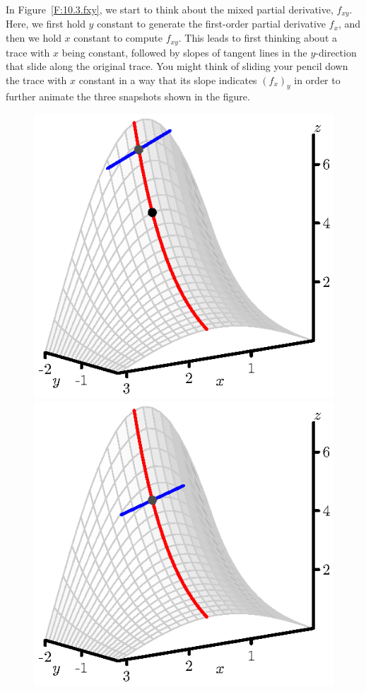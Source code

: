 \begin{activity}
	\item  In Figure~\ref{F:10.3.fxy}, we start to think about the mixed partial derivative, $f_{xy}$.  Here, we first hold $y$ constant to generate the first-order partial derivative $f_x$, and then we hold $x$ constant to compute $f_{xy}$.  This leads to first thinking about a trace with $x$ being constant, followed by slopes of tangent lines in the $y$-direction that slide along the original trace.  You might think of sliding your pencil down the trace with $x$ constant in a way that its slope indicates $(f_x)_y$ in order to further animate the three snapshots shown in the figure.
\begin{figure}[ht]
  \begin{center}
    \includegraphics[scale=0.8]{figures/fig_10_3_fxy_1.eps}
    \includegraphics[scale=0.8]{figures/fig_10_3_fxy_2.eps}

\end{center}
\end{figure}
\end{activity}

